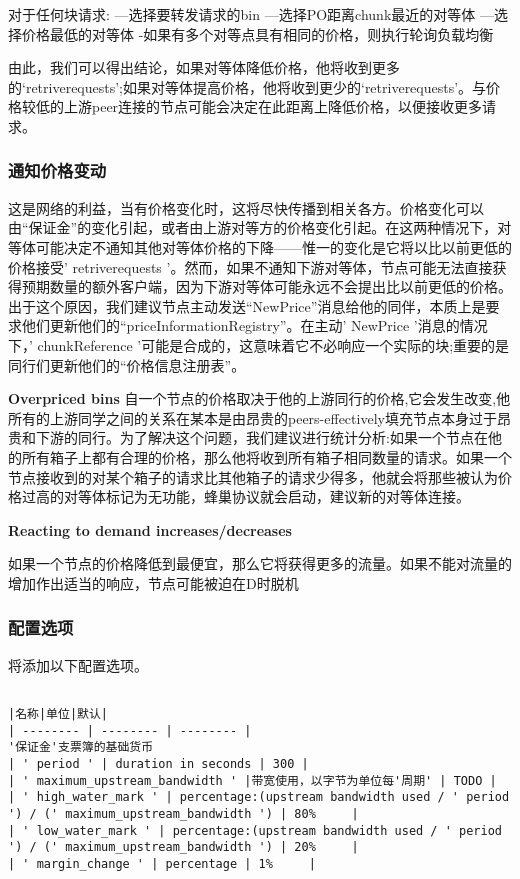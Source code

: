对于任何块请求:
—选择要转发请求的bin
—选择PO距离chunk最近的对等体
—选择价格最低的对等体
-如果有多个对等点具有相同的价格，则执行轮询负载均衡

由此，我们可以得出结论，如果对等体降低价格，他将收到更多的‘retriverequests’;如果对等体提高价格，他将收到更少的‘retriverequests’。与价格较低的上游peer连接的节点可能会决定在此距离上降低价格，以便接收更多请求。

\subsubsection{通知价格变动}
这是网络的利益，当有价格变化时，这将尽快传播到相关各方。价格变化可以由“保证金”的变化引起，或者由上游对等方的价格变化引起。在这两种情况下，对等体可能决定不通知其他对等体价格的下降——惟一的变化是它将以比以前更低的价格接受' retriverequests '。然而，如果不通知下游对等体，节点可能无法直接获得预期数量的额外客户端，因为下游对等体可能永远不会提出比以前更低的价格。出于这个原因，我们建议节点主动发送“NewPrice”消息给他的同伴，本质上是要求他们更新他们的“priceInformationRegistry”。在主动' NewPrice '消息的情况下，' chunkReference '可能是合成的，这意味着它不必响应一个实际的块;重要的是同行们更新他们的“价格信息注册表”。

\textbf{Overpriced bins}
自一个节点的价格取决于他的上游同行的价格,它会发生改变,他所有的上游同学之间的关系在某本是由昂贵的peers-effectively填充节点本身过于昂贵和下游的同行。为了解决这个问题，我们建议进行统计分析:如果一个节点在他的所有箱子上都有合理的价格，那么他将收到所有箱子相同数量的请求。如果一个节点接收到的对某个箱子的请求比其他箱子的请求少得多，他就会将那些被认为价格过高的对等体标记为无功能，蜂巢协议就会启动，建议新的对等体连接。 

\textbf{Reacting to demand increases/decreases}

如果一个节点的价格降低到最便宜，那么它将获得更多的流量。如果不能对流量的增加作出适当的响应，节点可能被迫在D时脱机

\subsubsection{配置选项}
将添加以下配置选项。 

\begin{verbatim}

|名称|单位|默认|
| -------- | -------- | -------- |
'保证金'支票簿的基础货币
| ' period ' | duration in seconds | 300 |
| ' maximum_upstream_bandwidth ' |带宽使用，以字节为单位每'周期' | TODO |
| ' high_water_mark ' | percentage:(upstream bandwidth used / ' period ') / (' maximum_upstream_bandwidth ') | 80%     |
| ' low_water_mark ' | percentage:(upstream bandwidth used / ' period ') / (' maximum_upstream_bandwidth ') | 20%     |
| ' margin_change ' | percentage | 1%     |

\end{verbatim}

